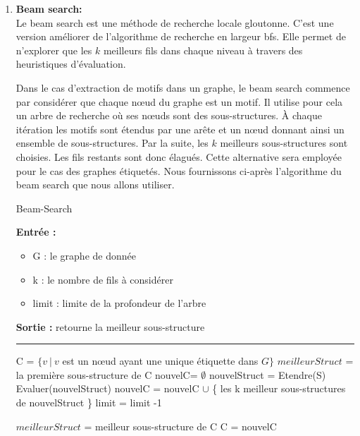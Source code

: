 \documentclass[a4paper,oneside,12pt]{report}
\theoremstyle{definition}
\begin{document}
\begin{enumerate}

\item \textbf{Beam search:}\\

Le beam search est une méthode de recherche locale gloutonne. C'est une version améliorer de l'algorithme de recherche en largeur \gls{bfs}. Elle permet de n'explorer que les $k$ meilleurs fils dans chaque niveau à travers des heuristiques d'évaluation.

Dans le cas d'extraction de motifs dans un graphe, le beam search commence par considérer que chaque nœud du graphe est un motif. Il utilise pour cela un arbre de recherche où ses nœuds sont des sous-structures. À chaque itération les motifs sont étendus par une arête et un nœud donnant ainsi un ensemble de sous-structures. Par la suite, les $k$ meilleurs sous-structures sont choisies. Les fils restants sont donc élagués. %
Cette alternative sera employée pour le cas des graphes étiquetés. Nous fournissons ci-après l'algorithme du beam search que nous allons utiliser. 


\begin{algorithm}[H]
					\label{alg:beamSearch}
					\caption{Beam-Search}
					\textbf{Entrée :}
						\begin{itemize}[label=$\bullet$]
							\item G : le graphe de donnée
							\item k : le nombre de fils à considérer
							\item limit : limite de la profondeur de l'arbre
						\end{itemize}
					\textbf{Sortie :} retourne la meilleur sous-structure\\							\noindent\rule{\textwidth}{1pt}
						
						
				\begin{algorithmic} [1]
					\STATE C = $\{v\ |\ v$ est un nœud ayant une unique étiquette dans  $G\}$
					\STATE $meilleurStruct$ = la première sous-structure de C
					\REPEAT
					\STATE nouvelC= $\emptyset$
						\STATE nouvelStruct = Etendre(S)
						\STATE Evaluer(nouvelStruct)
						\STATE nouvelC = nouvelC $\cup$ \{ les k meilleur sous-structures de nouvelStruct \}
					\ENDFOR
					\STATE limit = limit -1
					
					\STATE $meilleurStruct$  = meilleur sous-structure de C
					\ENDIF
					\STATE C = nouvelC
					

\end{algorithmic}
\end{algorithm}
\end{enumerate}
\end{document}
